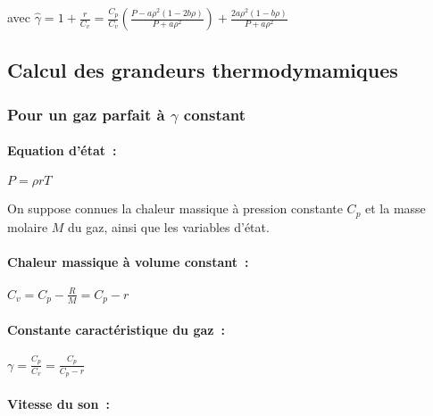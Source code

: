 avec $\hat{\gamma} = 1 + \displaystyle\frac{r}{C_v}
= \displaystyle\frac{C_p}{C_v}
\displaystyle\left(\frac{P-a\rho^2 (1-2b\rho)}{P+a\rho^2}\right)
+ \displaystyle\frac{2a\rho^2 (1-b\rho)}{P+a\rho^2}$



\subsection*{Calcul des grandeurs thermodymamiques}

\subsubsection*{Pour un gaz parfait à $\gamma$ constant}

\paragraph{Equation d'état~:}

$P = \rho r T$

On suppose connues la chaleur massique à pression constante $C_p$
et la masse molaire $M$ du gaz, ainsi que les variables d'état.

\paragraph{Chaleur massique à volume constant~:}

$C_v = C_p - \displaystyle\frac{R}{M} = C_p - r$


\paragraph{Constante caractéristique du gaz~:}

$\gamma = \displaystyle\frac{C_p}{C_v} = \displaystyle\frac{C_p}{C_p - r}$


\paragraph{Vitesse du son~:}

